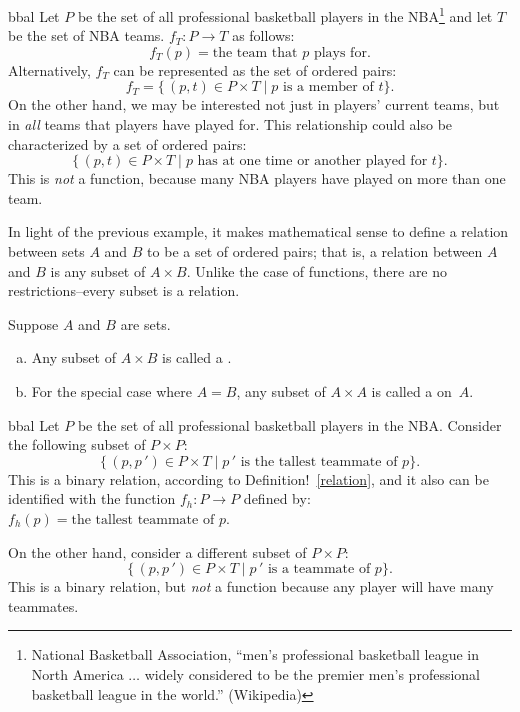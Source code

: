 \begin{example}{bbal}
Let $P$ be the set of all professional basketball players in the NBA\footnote{National Basketball Association, ``men's professional basketball league in North America $\ldots$ widely considered to be the premier men's professional basketball league in the world.'' (Wikipedia)}  and let $T$ be the set of NBA teams.  $f_T: P \to T$ as follows:
$$f_T(p)=\text{the team that }p \text{ plays for}.$$
Alternatively, $f_T$ can be represented as the set of ordered pairs:
\[ f_T=\{\, (p,t)  \in  P \times T  \mid  p  \text{  is a member of } t\} .\]
On the other hand, we may be interested not just in  players' current teams, but in \emph{all} teams that players have played for.  This relationship could also be characterized by a set of ordered pairs: 
\[ \{\, (p,t)  \in  P \times T  \mid  p  \text{  has at one time or another played for } t\} .\]
This is \emph{not} a function, because many NBA players have played on more than one team.
\end{example}

In light of the previous example, it makes mathematical sense to  define a relation between sets $A$ and $B$ to be a set of ordered pairs; that is, a relation between $A$ and $B$  is any subset of $A \times B$. Unlike the case of functions, there are no restrictions--every subset is a relation.


\begin{defn} \label{relation}  Suppose $A$ and $B$ are sets. 
\begin{enumerate}[(a)]
\item Any subset of $A \times B$ is called a .
\item For the special case where $A = B$, any subset of $A \times A$ is called a   on~$A$.
\end{enumerate}
\end{defn}

\begin{example}{bbal}
Let $P$ be the set of all professional basketball players in the NBA. 
Consider the following subset of $P \times P$:
\[ \{\, (p,p\,')  \in  P \times T  \mid  p\,'  \text{  is the tallest teammate of } p\} .\]
This is a binary relation, according to Definition!~\ref{relation}, and it also can be identified with the function
 $f_h: P \to P$ defined by: $f_h(p)=\text{the tallest teammate of }p .$

On the other hand, consider a different subset of $P \times P$:
\[ \{\, (p,p\,')  \in  P \times T  \mid  p\,'  \text{  is a teammate of } p\} .\]
 This is a binary relation, but \emph{not} a function because any player will have many teammates.
\end{example}

